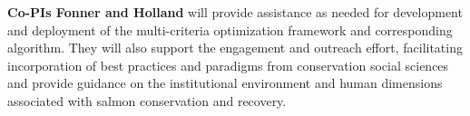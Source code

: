 \textbf{Co-PIs Fonner and Holland} will provide assistance as needed for development and deployment of the multi-criteria optimization framework and corresponding algorithm. They will also support the engagement and outreach effort, facilitating incorporation of best practices and paradigms from conservation social sciences and provide guidance on the institutional environment and human dimensions associated with salmon conservation and recovery.\\


%



